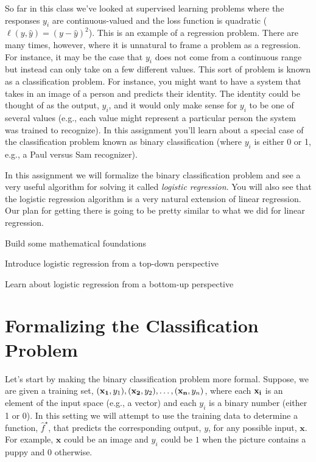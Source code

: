 \documentclass[assignment03_Solutions]{subfiles}
\begin{document}
So far in this class we've looked at supervised learning problems where the responses $y_i$ are continuous-valued and the loss function is quadratic ($\ell(y, \hat{y}) = (y-\hat{y})^2$).  This is an example of a regression problem.  There are many times, however, where it is unnatural to frame a problem as a regression.  For instance, it may be the case that $y_i$ does not come from a continuous range but instead can only take on a few different values.  This sort of problem is known as a classification problem.  For instance, you might want to have a system that takes in an image of a person and predicts their identity.  The identity could be thought of as the output, $y_i$, and it would only make sense for $y_i$ to be one of several values (e.g., each value might represent a particular person the system was trained to recognize).  In this assignment you'll learn about a special case of the classification problem known as binary classification (where $y_i$ is either 0 or 1, e.g., a Paul versus Sam recognizer).

In this assignment we will formalize the binary classification problem and see a very useful algorithm for solving it called \emph{logistic regression}.  You will also see that the logistic regression algorithm is a very natural extension of linear regression.  Our plan for getting there is going to be pretty similar to what we did for linear regression.
\bi
\item Build some mathematical foundations
\item Introduce logistic regression from a top-down perspective
\item Learn about logistic regression from a bottom-up perspective
\ei

\section{Formalizing the Classification Problem}
Let's start by making the binary classification problem more formal.  Suppose, we are given a training set, $(\mathbf{x_1}, y_1), (\mathbf{x_2}, y_2), \ldots, (\mathbf{x_n}, y_n)$, where each $\mathbf{x_i}$ is an element of the input space (e.g., a vector) and each $y_i$ is a binary number (either 1 or 0).  In this setting we will attempt to use the training data to determine a function, $\hat{f}^\star$, that predicts the corresponding output, $y$, for any possible input, $\mathbf{x}$.  For example,  $\mathbf{x}$ could be an image and $y_i$ could be $1$ when the picture contains a puppy and $0$ otherwise.
\end{document}
